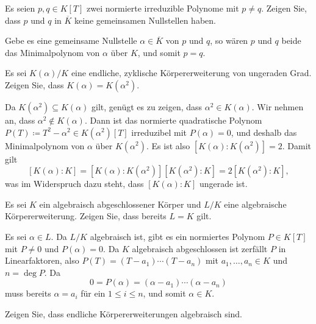 \begin{question}
  Es seien $p, q \in K[T]$ zwei normierte irreduzible Polynome mit $p \neq q$.
  Zeigen Sie, dass $p$ und $q$ in $\overline{K}$ keine gemeinsamen Nullstellen haben.
\end{question}


\begin{solution}
  Gebe es eine gemeinsame Nullstelle $\alpha \in \overline{K}$ von $p$ und $q$, so wären $p$ und $q$ beide das Minimalpolynom von $\alpha$ über $K$, und somit $p = q$.
\end{solution}


\begin{question}
  Es sei $K(\alpha)/K$ eine endliche, zyklische Körpererweiterung von ungeraden Grad.
  Zeigen Sie, dass $K(\alpha) = K(\alpha^2)$.
\end{question}


\begin{solution}
  Da $K(\alpha^2) \subseteq K(\alpha)$ gilt, genügt es zu zeigen, dass $\alpha^2 \in K(\alpha)$.
  Wir nehmen an, dass $\alpha^2 \notin K(\alpha)$.
  Dann ist das normierte quadratische Polynom $P(T) \coloneqq T^2 - \alpha^2 \in K(\alpha^2)[T]$ irreduzibel mit $P(\alpha) = 0$, und deshalb das Minimalpolynom von $\alpha$ über $K(\alpha^2)$.
  Es ist also $[K(\alpha) : K(\alpha^2)] = 2$.
  Damit gilt
  \[
      [K(\alpha) : K]
    = [K(\alpha) : K(\alpha^2)] [K(\alpha^2) : K]
    = 2 [K(\alpha^2) : K],
  \]
  was im Widerspruch dazu steht, dass $[K(\alpha) : K]$ ungerade ist.
\end{solution}


\begin{question}
  Es sei $K$ ein algebraisch abgeschlossener Körper und $L/K$ eine algebraische Körpererweiterung.
  Zeigen Sie, dass bereits $L = K$ gilt.
\end{question}


\begin{solution}
  Es sei $\alpha \in L$.
  Da $L/K$ algebraisch ist, gibt es ein normiertes Polynom $P \in K[T]$ mit $P \neq 0$ und $P(\alpha) = 0$.
  Da $K$ algebraisch abgeschlossen ist zerfällt $P$ in Linearfaktoren, also $P(T) = (T - a_1) \dotsm (T - a_n)$ mit $a_1, \dotsc, a_n \in K$ und $n = \deg P$.
  Da
  \[
      0
    = P(\alpha)
    = (\alpha - a_1) \dotsm (\alpha - a_n)
  \]
  muss bereits $\alpha = a_i$ für ein $1 \leq i \leq n$, und somit $\alpha \in K$.
\end{solution}


\begin{question}
  Zeigen Sie, dass endliche Körpererweiterungen algebraisch sind.
\end{question}



